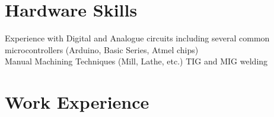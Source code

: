 \documentclass[a4paper,10pt]{article} %
\begin{document}

\section{Hardware Skills}

Experience with Digital and Analogue circuits including several common microcontrollers (Arduino, Basic Series, Atmel chips) \\
Manual Machining Techniques (Mill, Lathe, etc.) TIG and MIG welding\\



\section{Work Experience}
\end{document}
